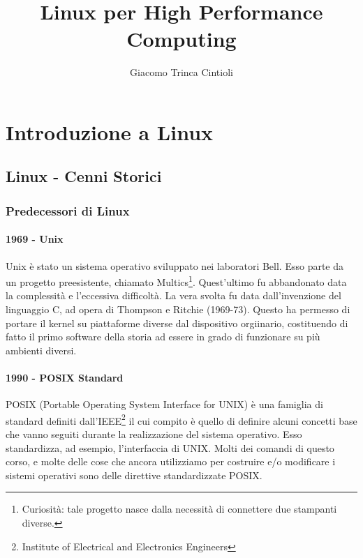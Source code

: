 \documentclass[11pt]{book}
\begin{document}
\title{\sc Linux per High Performance Computing}
\author{\sc Giacomo Trinca Cintioli}
\maketitle

\tableofcontents
\part{Introduzione a Linux}
\chapter{Linux - Cenni Storici}
\section{Predecessori di Linux}
\subsection{1969 - Unix}
Unix è stato un sistema operativo sviluppato nei laboratori Bell. Esso parte da un progetto preesistente, chiamato Multics\footnote{Curiosità: tale progetto nasce dalla necessità di connettere due stampanti diverse.}. Quest'ultimo fu abbandonato data la complessità e l'eccessiva difficoltà. La vera svolta fu data dall'invenzione del linguaggio C, ad opera di Thompson e Ritchie (1969-73). Questo ha permesso di portare il kernel su piattaforme diverse dal dispositivo orgiinario, costituendo di fatto il primo software della storia ad essere in grado di funzionare su più ambienti diversi. 

\subsection{1990 - POSIX Standard}
POSIX (Portable Operating System Interface for UNIX) è una famiglia di standard definiti dall'IEEE\footnote{Institute of Electrical and Electronics Engineers} il cui compito è quello di definire alcuni concetti base che vanno seguiti durante la realizzazione del sistema operativo. Esso standardizza, ad esempio, l'interfaccia di UNIX. Molti dei comandi 
di questo corso, e molte delle cose che ancora utilizziamo per costruire e/o modificare i sistemi operativi sono delle direttive standardizzate POSIX. 
\end{document}
